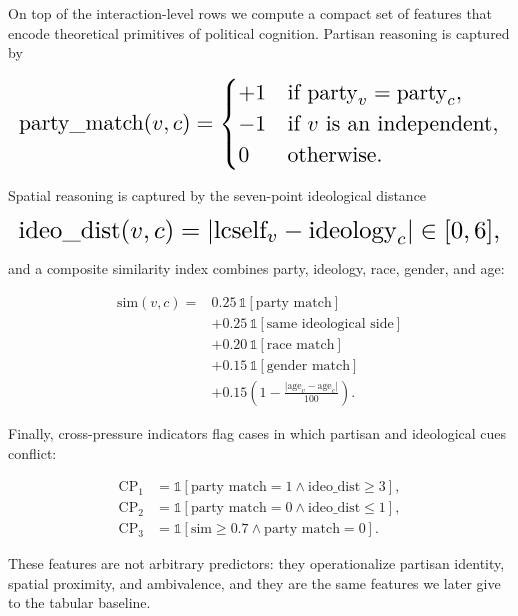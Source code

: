 On top of the interaction-level rows we compute a compact set of
features that encode theoretical primitives of political cognition.
Partisan reasoning is captured by

\begin{equation*}
\resizebox{\columnwidth}{!}{$\displaystyle 
\text{party\_match}(v,c)=
\begin{cases}
+1 & \text{if } \text{party}_v=\text{party}_c,\\
-1 & \text{if } v \text{ is an independent},\\
0 & \text{otherwise}.
\end{cases}
$}
\end{equation*}

Spatial reasoning is captured by the seven-point ideological distance

\begin{equation*}
\resizebox{\columnwidth}{!}{$\displaystyle 
\text{ideo\_dist}(v,c)=\lvert \text{lcself}_v-\text{ideology}_c\rvert\in[0,6],
$}
\end{equation*}

and a composite similarity index combines party, ideology, race, gender,
and age:

\[
\begin{aligned}
\text{sim}(v,c) ={}& 0.25\,\mathbb{1}[\text{party match}] \\
&+0.25\,\mathbb{1}[\text{same ideological side}] \\
&+0.20\,\mathbb{1}[\text{race match}] \\
&+0.15\,\mathbb{1}[\text{gender match}] \\
&+0.15\left(1-\frac{\lvert \text{age}_v-\text{age}_c\rvert}{100}\right).
\end{aligned}
\]

Finally, cross-pressure indicators flag cases in which partisan and
ideological cues conflict:

\[
\begin{aligned}
\text{CP}_1 &= \mathbb{1}[\text{party match}=1 \land \text{ideo\_dist}\ge 3],\\
\text{CP}_2 &= \mathbb{1}[\text{party match}=0 \land \text{ideo\_dist}\le 1],\\
\text{CP}_3 &= \mathbb{1}[\text{sim}\ge 0.7 \land \text{party match}=0].
\end{aligned}
\]

These features are not arbitrary predictors: they operationalize
partisan identity, spatial proximity, and ambivalence, and they are the
same features we later give to the tabular baseline.

